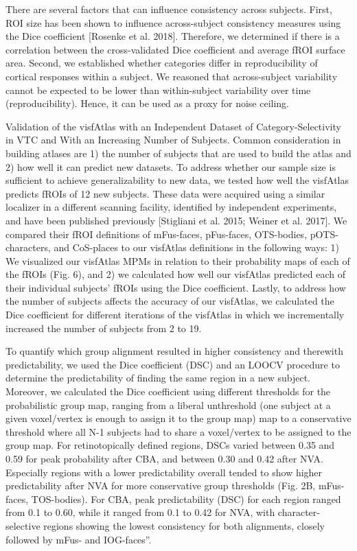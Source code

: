There are several factors that can influence consistency across subjects.
%
First, ROI size has been shown to influence across-subject consistency measures
using the Dice coefficient [Rosenke et al. 2018].
%
Therefore, we determined if there is a correlation between the cross-validated
Dice coefficient and average fROI surface area.
%
Second, we established whether categories differ in reproducibility of cortical
responses within a subject.
%
We reasoned that across-subject variability cannot be expected to be lower than
within-subject variability over time (reproducibility).
%
Hence, it can be used as a proxy for noise ceiling.

Validation of the visfAtlas with an Independent Dataset of Category-Selectivity
in VTC and With an Increasing Number of Subjects.
%
Common consideration in building atlases are
%
1) the number of subjects that are used to build the atlas and
%
2) how well it can predict new datasets.
%
To address whether our sample size is sufficient to achieve generalizability to
new data, we tested how well the visfAtlas predicts fROIs of 12 new subjects.
%
These data were acquired using a similar localizer in a different scanning
facility, identified by independent experiments, and have been published
previously [Stigliani et al.  2015; Weiner et al. 2017].
%
We compared their fROI definitions of mFus-faces, pFus-faces, OTS-bodies,
pOTS-characters, and CoS-places to our visfAtlas definitions in the following
ways:
%
1) We visualized our visfAtlas MPMs in relation to their probability maps of
each of the fROIs (Fig. 6), and
%
2) we calculated how well our visfAtlas predicted each of their individual
subjects' fROIs using the Dice coefficient.
%
Lastly, to address how the number of subjects affects the accuracy of our
visfAtlas, we calculated the Dice coefficient for different iterations of the
visfAtlas in which we incrementally increased the number of subjects from 2 to
19.

To quantify which group alignment resulted in higher consistency and therewith
predictability, we used the Dice coefficient (DSC) and an LOOCV procedure to
determine the predictability of finding the same region in a new subject.
%
Moreover, we calculated the Dice coefficient using different thresholds for the
probabilistic group map, ranging from a liberal unthreshold (one subject at a
given voxel/vertex is enough to assign it to the group map) map to a
conservative threshold where all N-1 subjects had to share a voxel/vertex to be
assigned to the group map.
%
For retinotopically defined regions, DSCs varied between 0.35 and 0.59 for peak
probability after CBA, and between 0.30 and 0.42 after NVA.
%
Especially regions with a lower predictability overall tended to show higher
predictability after NVA for more conservative group thresholds (Fig. 2B,
mFus-faces, TOS-bodies).
%
For CBA, peak predictability (DSC) for each region ranged from 0.1 to 0.60,
while it ranged from 0.1 to 0.42 for NVA, with character-selective regions
showing the lowest consistency for both alignments, closely followed by mFus-
and IOG-faces''.

